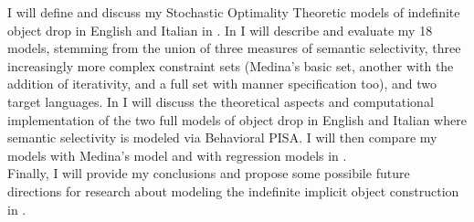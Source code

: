 I will define and discuss my Stochastic Optimality Theoretic models of indefinite object drop in English and Italian in . In  I will describe and evaluate my 18 models, stemming from the union of three measures of semantic selectivity, three increasingly more complex constraint sets (Medina's basic set, another with the addition of iterativity, and a full set with manner specification too), and two target languages. In  I will discuss the theoretical aspects and computational implementation of the two full models of object drop in English and Italian where semantic selectivity is modeled via Behavioral PISA. I will then compare my models with Medina's model and with regression models in .\\
Finally, I will provide my conclusions and propose some possibile future directions for research about modeling the indefinite implicit object construction in .


